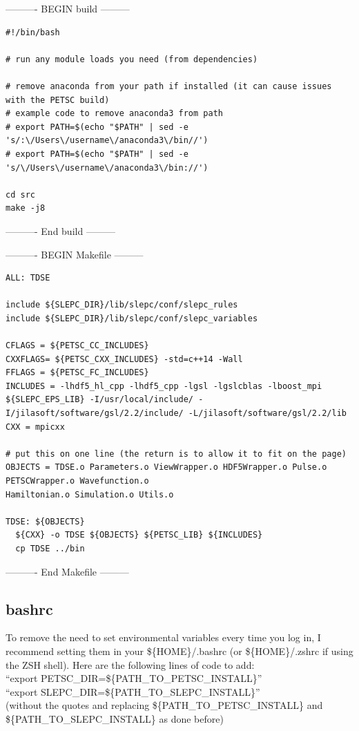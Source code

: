 \documentclass{article}
\begin{document}
---------- BEGIN build ---------
\begin{verbatim}
#!/bin/bash

# run any module loads you need (from dependencies)

# remove anaconda from your path if installed (it can cause issues with the PETSC build)
# example code to remove anaconda3 from path
# export PATH=$(echo "$PATH" | sed -e 's/:\/Users\/username\/anaconda3\/bin//')
# export PATH=$(echo "$PATH" | sed -e 's/\/Users\/username\/anaconda3\/bin://')

cd src
make -j8
\end{verbatim}
---------- End build ---------

---------- BEGIN Makefile ---------
\begin{verbatim}
ALL: TDSE

include ${SLEPC_DIR}/lib/slepc/conf/slepc_rules
include ${SLEPC_DIR}/lib/slepc/conf/slepc_variables

CFLAGS = ${PETSC_CC_INCLUDES}
CXXFLAGS= ${PETSC_CXX_INCLUDES} -std=c++14 -Wall 
FFLAGS = ${PETSC_FC_INCLUDES}
INCLUDES = -lhdf5_hl_cpp -lhdf5_cpp -lgsl -lgslcblas -lboost_mpi ${SLEPC_EPS_LIB} -I/usr/local/include/ -I/jilasoft/software/gsl/2.2/include/ -L/jilasoft/software/gsl/2.2/lib
CXX = mpicxx

# put this on one line (the return is to allow it to fit on the page)
OBJECTS = TDSE.o Parameters.o ViewWrapper.o HDF5Wrapper.o Pulse.o PETSCWrapper.o Wavefunction.o 
Hamiltonian.o Simulation.o Utils.o

TDSE: ${OBJECTS}
  ${CXX} -o TDSE ${OBJECTS} ${PETSC_LIB} ${INCLUDES}
  cp TDSE ../bin
\end{verbatim}
---------- End Makefile ---------

\subsection{bashrc} %
\label{sub:bashrc}
To remove the need to set environmental variables every time you log in, I recommend setting them in your \$\{HOME\}/.bashrc (or \$\{HOME\}/.zshrc if using the ZSH shell). Here are the following lines of code to add: 
\\``export PETSC\_DIR=\$\{PATH\_TO\_PETSC\_INSTALL\}''
\\``export SLEPC\_DIR=\$\{PATH\_TO\_SLEPC\_INSTALL\}''
\\(without the quotes and replacing \$\{PATH\_TO\_PETSC\_INSTALL\} and \$\{PATH\_TO\_SLEPC\_INSTALL\} as done before)
\end{document}
